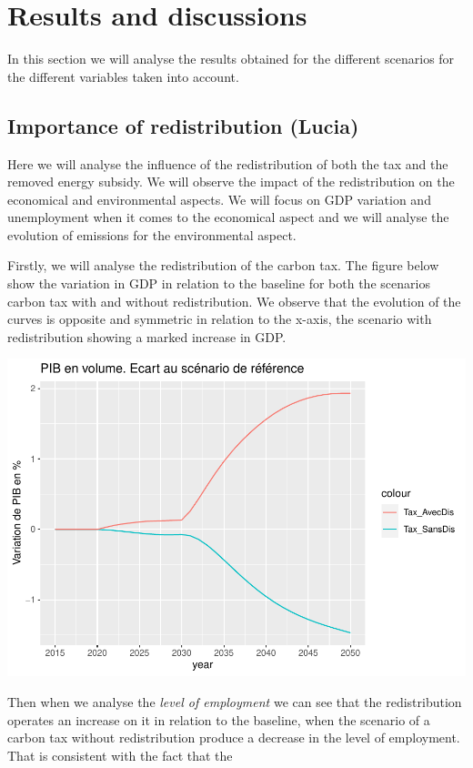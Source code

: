\documentclass[
]{article}
\begin{document}
\hypertarget{results-and-discussions}{%
\section{Results and discussions}\label{results-and-discussions}}

In this section we will analyse the results obtained for the different
scenarios for the different variables taken into account.

\hypertarget{importance-of-redistribution-lucia}{%
\subsection{Importance of redistribution
(Lucia)}\label{importance-of-redistribution-lucia}}

Here we will analyse the influence of the redistribution of both the tax
and the removed energy subsidy. We will observe the impact of the
redistribution on the economical and environmental aspects. We will
focus on GDP variation and unemployment when it comes to the economical
aspect and we will analyse the evolution of emissions for the
environmental aspect.

Firstly, we will analyse the redistribution of the carbon tax. The
figure below show the variation in GDP in relation to the baseline for
both the scenarios carbon tax with and without redistribution. We
observe that the evolution of the curves is opposite and symmetric in
relation to the x-axis, the scenario with redistribution showing a
marked increase in GDP.

\begin{center}\includegraphics[width=0.7\linewidth,height=0.7\textheight]{Modele-ThreeMe-Tunisie_Sequeira_Valilou_Wang_files/figure-latex/unnamed-chunk-8-1} \end{center}

Then when we analyse the \emph{level of employment} we can see that the
redistribution operates an increase on it in relation to the baseline,
when the scenario of a carbon tax without redistribution produce a
decrease in the level of employment. That is consistent with the fact
that the
\end{document}
